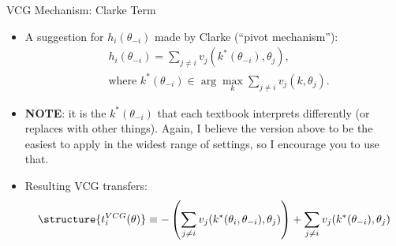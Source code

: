 \documentclass[english,10pt
,aspectratio=169
,handout
]{beamer}
\begin{document}
\begin{frame}{VCG Mechanism: Clarke Term}
\begin{itemize}
	\item A suggestion for $h_i(\theta_{-i})$ made by Clarke (``pivot mechanism''):
	\vspace{-0.5em}\begin{align*}
	&h_{i}(\theta_{-i})=\sum_{j\neq i} v_{j}(k^*(\theta_{-i}),\theta_{j}),
	\\ &\text{where } k^*(\theta_{-i}) \in \arg\max_{k} \sum_{j\neq i}v_{j}(k,\theta_{j}).
	\end{align*}

	\item \textbf{NOTE}: it is the $k^*(\theta_{-i})$ that each textbook interprets differently (or replaces with other things). Again, I believe the version above to be the easiest to apply in the widest range of settings, so I encourage you to use that.
	
	\item Resulting \alert{VCG transfers}:
	\vspace{-0.5em}\begin{align*}
	\structure{ t_{i}^{VCG}(\theta) } \equiv -\left(\sum_{j\neq i} v_{j}(k^*(\theta_i, \theta_{-i}), \theta_{j}) \right) + \sum_{j\neq i} v_{j}(k^*(\theta_{-i}), \theta_{j})
	\end{align*}
\end{itemize}
\end{frame}
\end{document}
